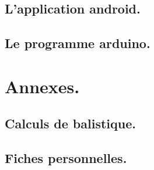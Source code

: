 \documentclass{report}
\begin{document}
\chapter{L'application android.}
% 

\chapter{Le programme arduino.}
% 

\part{Annexes.}
\appendix

\chapter{Calculs de balistique.}
% 

\chapter{Fiches personnelles.}

\newpage
\listoffigures
{}
\end{document}
